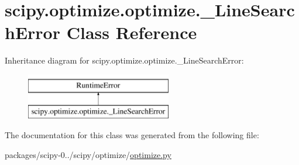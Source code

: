 \hypertarget{classscipy_1_1optimize_1_1optimize_1_1__LineSearchError}{}\section{scipy.\+optimize.\+optimize.\+\_\+\+Line\+Search\+Error Class Reference}
\label{classscipy_1_1optimize_1_1optimize_1_1__LineSearchError}
Inheritance diagram for scipy.\+optimize.\+optimize.\+\_\+\+Line\+Search\+Error\+:\begin{figure}[H]
\begin{center}
\leavevmode
\includegraphics[height=2.000000cm]{classscipy_1_1optimize_1_1optimize_1_1__LineSearchError}
\end{center}
\end{figure}


The documentation for this class was generated from the following file\+:\begin{DoxyCompactItemize}
\item 
packages/scipy-\/0../scipy/optimize/\hyperlink{optimize_8py}{optimize.\+py}\end{DoxyCompactItemize}
